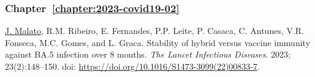 \subsubsection{Chapter~\ref{chapter:2023-covid19-02}}
\vspace{-1em}
\noindent\underline{J. Malato}, R.M. Ribeiro, E. Fernandes, P.P. Leite, P. Casaca, C. Antunes, V.R. Fonseca, M.C. Gomes, and L. Graca. Stability of hybrid versus vaccine immunity against BA.5 infection over 8 months. \textit{The Lancet Infectious Diseases}. 2023; 23(2):148--150. doi: \url{https://doi.org/10.1016/S1473-3099(22)00833-7}.

\vfill
